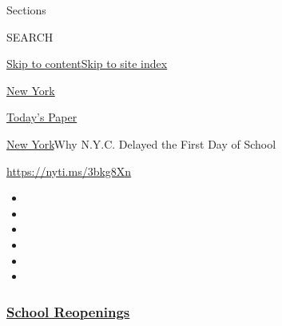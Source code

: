 Sections

SEARCH

\protect\hyperlink{site-content}{Skip to
content}\protect\hyperlink{site-index}{Skip to site index}

\href{https://www.nytimes3xbfgragh.onion/section/nyregion}{New York}

\href{https://myaccount.nytimes3xbfgragh.onion/auth/login?response_type=cookie\&client_id=vi}{}

\href{https://www.nytimes3xbfgragh.onion/section/todayspaper}{Today's
Paper}

\href{/section/nyregion}{New York}\textbar{}Why N.Y.C. Delayed the First
Day of School

\url{https://nyti.ms/3bkg8Xn}

\begin{itemize}
\item
\item
\item
\item
\item
\item
\end{itemize}

\hypertarget{school-reopenings}{%
\subsubsection{\texorpdfstring{\href{https://www.nytimes3xbfgragh.onion/spotlight/schools-reopening?name=styln-coronavirus-schools-reopening\&region=TOP_BANNER\&block=storyline_menu_recirc\&action=click\&pgtype=Article\&impression_id=530463f0-f27a-11ea-adaf-9558d58a001f\&variant=undefined}{School
Reopenings}}{School Reopenings}}\label{school-reopenings}}

